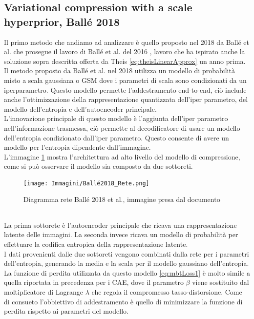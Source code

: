 \subsection{Variational compression with a scale hyperprior, Ballé 2018}
Il primo metodo che andiamo ad analizzare è quello proposto nel 2018 da Ballé et al. \cite{minnen2018joint} che prosegue il lavoro di Ballé et al. del 2016 \cite{balle2018variational}, lavoro che ha ispirato anche la soluzione sopra descritta offerta da Theis \ref{eq:theisLinearApprox} un anno prima.\\
Il metodo proposto da Ballé et al. nel 2018 utilizza un modello di probabilità misto a scala gaussiana o GSM dove i parametri di scala sono condizionati da un iperparametro. Questo modello permette l’addestramento end-to-end, ciò include anche l’ottimizzazione della rappresentazione quantizzata dell’iper parametro, del modello dell’entropia e dell’autoencoder principale.\\
L’innovazione principale di questo modello è l’aggiunta dell’iper parametro nell’informazione trasmessa, ciò permette al decodificatore di usare un modello dell’entropia condizionato dall’iper parametro. Questo consente di avere un modello per l’entropia dipendente dall’immagine.\\
L’immagine \ref{fig:balle2018Network} mostra l’architettura ad alto livello del modello di compressione, come si può osservare il modello sia composto da due sottoreti.
\begin{figure}[!h]
    \centering
    \texttt{[image: Immagini/Ballé2018\_Rete.png]}
    \caption{Diagramma rete Ballé 2018 et al., immagine presa dal documento \cite{minnen2018joint}}
    \label{fig:balle2018Network}
\end{figure}\\
La prima sottorete è l’autoencoder principale che ricava una rappresentazione latente delle immagini. La seconda invece ricava un modello di probabilità per effettuare la codifica entropica della rappresentazione latente.\\
I dati provenienti dalle due sottoreti vengono combinati dalla rete per i parametri dell’entropia, generando la media e la scala per il modello gaussiano dell’entropia.\\
La funzione di perdita utilizzata da questo modello \ref{eq:mbtLoss1} è molto simile a quella riportata in precedenza per i CAE, dove il parametro $\beta$ viene sostituito dal moltiplicatore di Lagrange $\lambda$ che regola il compromesso tasso-distorsione. Come di consueto l’obbiettivo di addestramento è quello di minimizzare la funzione di perdita rispetto ai parametri del modello.\\
